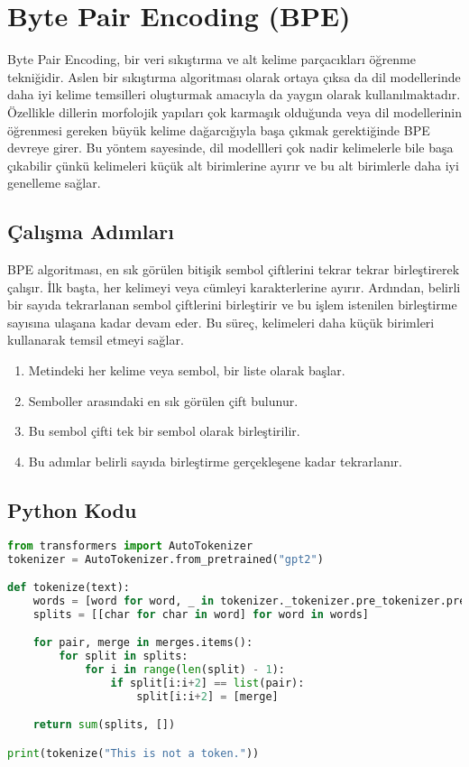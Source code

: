 \section{Byte Pair Encoding (BPE)}

Byte Pair Encoding, bir veri sıkıştırma ve alt kelime parçacıkları öğrenme tekniğidir. Aslen bir sıkıştırma algoritması olarak ortaya çıksa da dil modellerinde daha iyi kelime temsilleri oluşturmak amacıyla da yaygın olarak kullanılmaktadır. Özellikle dillerin morfolojik yapıları çok karmaşık olduğunda veya dil modellerinin öğrenmesi gereken büyük kelime dağarcığıyla başa çıkmak gerektiğinde BPE devreye girer. Bu yöntem sayesinde, dil modellleri çok nadir kelimelerle bile başa çıkabilir çünkü kelimeleri küçük alt birimlerine ayırır ve bu alt birimlerle daha iyi genelleme sağlar. 

\subsection{Çalışma Adımları}

BPE algoritması, en sık görülen bitişik sembol çiftlerini tekrar tekrar birleştirerek çalışır. İlk başta, her kelimeyi veya cümleyi karakterlerine ayırır. Ardından, belirli bir sayıda tekrarlanan sembol çiftlerini birleştirir ve bu işlem istenilen birleştirme sayısına ulaşana kadar devam eder. Bu süreç, kelimeleri daha küçük birimleri kullanarak temsil etmeyi sağlar.

\begin{enumerate}
    \item Metindeki her kelime veya sembol, bir liste olarak başlar.
    \item Semboller arasındaki en sık görülen çift bulunur.
    \item Bu sembol çifti tek bir sembol olarak birleştirilir.
    \item Bu adımlar belirli sayıda birleştirme gerçekleşene kadar tekrarlanır.
\end{enumerate}

\subsection{Python Kodu}

\begin{lstlisting}[language=Python]
from transformers import AutoTokenizer
tokenizer = AutoTokenizer.from_pretrained("gpt2")

def tokenize(text):
    words = [word for word, _ in tokenizer._tokenizer.pre_tokenizer.pre_tokenize_str(text)]
    splits = [[char for char in word] for word in words]

    for pair, merge in merges.items():
        for split in splits:
            for i in range(len(split) - 1):
                if split[i:i+2] == list(pair):
                    split[i:i+2] = [merge]

    return sum(splits, [])

print(tokenize("This is not a token."))  
\end{lstlisting}

\newpage